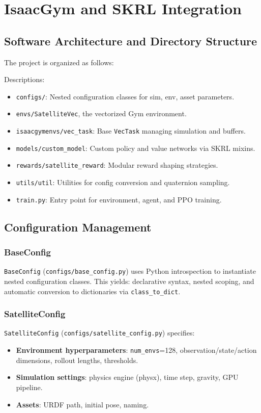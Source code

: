 \documentclass[a4paper,oneside]{book}
\theoremstyle{definition}
\begin{document}
\chapter{IsaacGym and SKRL Integration}

\section{Software Architecture and Directory Structure}
The project is organized as follows:


Descriptions:
\begin{itemize}
\item \texttt{configs/}: Nested configuration classes for sim, env, asset parameters.
\item \texttt{envs/SatelliteVec}, the vectorized Gym environment.
\item \texttt{isaacgymenvs/vec_task}: Base \texttt{VecTask} managing simulation and buffers.
\item \texttt{models/custom_model}: Custom policy and value networks via SKRL mixins.
\item \texttt{rewards/satellite_reward}: Modular reward shaping strategies.
\item \texttt{utils/util}: Utilities for config conversion and quaternion sampling.
\item \texttt{train.py}: Entry point for environment, agent, and PPO training.
\end{itemize}

\section{Configuration Management}

\subsection{BaseConfig}
\texttt{BaseConfig} (\texttt{configs/base\_config.py}) uses Python introspection to instantiate nested configuration classes. This yields: declarative syntax, nested scoping, and automatic conversion to dictionaries via \texttt{class\_to\_dict}.

\subsection{SatelliteConfig}
\texttt{SatelliteConfig} (\texttt{configs/satellite\_config.py}) specifies:
\begin{itemize}
\item \textbf{Environment hyperparameters}: \texttt{num\_envs}=128, observation/state/action dimensions, rollout lengths, thresholds.
\item \textbf{Simulation settings}: physics engine (physx), time step, gravity, GPU pipeline.
\item \textbf{Assets}: URDF path, initial pose, naming.
\end{itemize}
\end{document}
